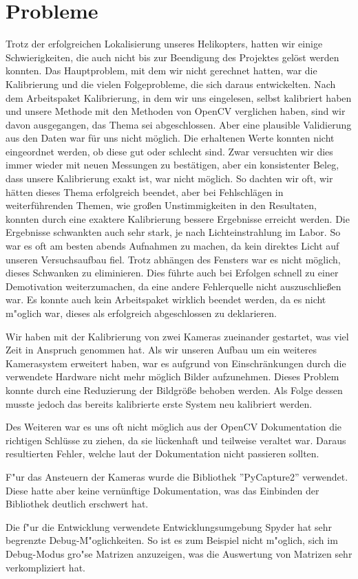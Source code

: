 \chapter{Probleme}
\label{cha:probleme}

Trotz der erfolgreichen Lokalisierung unseres Helikopters, hatten wir einige Schwierigkeiten, die auch nicht bis zur Beendigung des Projektes gelöst werden konnten. Das Hauptproblem, mit dem wir nicht gerechnet hatten, war die Kalibrierung und die vielen Folgeprobleme, die sich daraus entwickelten. Nach dem Arbeitspaket Kalibrierung, in dem wir uns eingelesen, selbst kalibriert haben und unsere Methode mit den Methoden von OpenCV verglichen haben, sind wir davon ausgegangen, das Thema sei abgeschlossen. Aber eine plausible Validierung aus den Daten war für uns nicht möglich. Die erhaltenen Werte konnten nicht eingeordnet werden, ob diese gut oder schlecht sind. Zwar versuchten wir dies immer wieder mit neuen Messungen zu bestätigen, aber ein konsistenter Beleg, dass unsere Kalibrierung exakt ist, war nicht möglich. So dachten wir oft, wir hätten dieses Thema erfolgreich beendet, aber bei Fehlschlägen in weiterführenden Themen, wie großen Unstimmigkeiten in den Resultaten, konnten durch eine exaktere Kalibrierung bessere Ergebnisse erreicht werden. Die Ergebnisse schwankten auch sehr stark, je nach Lichteinstrahlung im Labor. So war es oft am besten abends Aufnahmen zu machen, da kein direktes Licht auf unseren Versuchsaufbau fiel. Trotz  abhängen des Fensters war es nicht möglich, dieses Schwanken zu eliminieren. Dies führte auch bei Erfolgen schnell zu einer Demotivation weiterzumachen, da eine andere Fehlerquelle nicht auszuschließen war. Es konnte auch kein Arbeitspaket wirklich beendet werden, da es nicht m"oglich war, dieses als erfolgreich abgeschlossen zu deklarieren.

\noindent Wir haben mit der Kalibrierung von zwei Kameras zueinander gestartet, was viel Zeit in Anspruch genommen hat. Als wir unseren Aufbau um ein weiteres Kamerasystem erweitert haben, war es aufgrund von Einschränkungen durch die verwendete Hardware nicht mehr möglich Bilder aufzunehmen. Dieses Problem konnte durch eine Reduzierung der Bildgröße behoben werden. Als Folge dessen musste jedoch das bereits kalibrierte erste System neu kalibriert werden.

\noindent Des Weiteren war es uns oft nicht möglich aus der OpenCV Dokumentation die richtigen Schlüsse zu ziehen, da sie lückenhaft und teilweise veraltet war. Daraus resultierten Fehler, welche laut der Dokumentation nicht passieren sollten.\newline

\noindent F"ur das Ansteuern der Kameras wurde die Bibliothek ''PyCapture2'' verwendet. Diese hatte aber keine vernünftige Dokumentation, was das Einbinden der Bibliothek deutlich erschwert hat.\newline

\noindent Die f"ur die Entwicklung verwendete Entwicklungsumgebung Spyder hat sehr begrenzte Debug-M"oglichkeiten. So ist es zum Beispiel nicht m"oglich, sich im Debug-Modus gro"se Matrizen anzuzeigen, was die Auswertung von Matrizen sehr verkompliziert hat.

